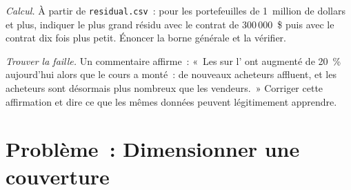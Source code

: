 \begin{exercise}[$\star\star\star$]\label{exo:m1:futures-contracts-and-exchanges:7}
\emph{Calcul.} À partir de \texttt{residual.csv}~: pour les portefeuilles de 1~million de dollars
et plus, indiquer le plus grand résidu avec le contrat de 300\,000~\$ puis avec le contrat
dix fois plus petit. Énoncer la borne générale et la vérifier.
\end{exercise}

\begin{exercise}[$\star\star\star$]\label{exo:m1:futures-contracts-and-exchanges:8}
\emph{Trouver la faille.} Un commentaire affirme~: «~Les  sur l' ont augmenté de 20~\% aujourd'hui alors que le cours a monté~: de nouveaux
acheteurs affluent, et les acheteurs sont désormais plus nombreux que les vendeurs.~» Corriger
cette affirmation et dire ce que les mêmes données peuvent légitimement apprendre.
\end{exercise}

\section{Problème~: Dimensionner une couverture}

